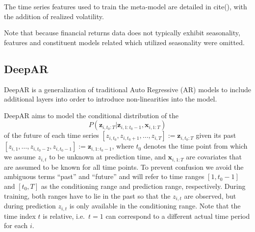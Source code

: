 \documentclass{article}
\newcommand{\z}[2]{z_{#1, #2}}
\newcommand{\zVec}[3]{\mathbf{z}_{#1, #2:#3}}
\newcommand{\xVec}[3]{\mathbf{x}_{#1, #2:#3}}
\begin{document}
The time series features used to train the meta-model are detailed in cite(), with the addition of realized volatility.

Note that because financial returns data does not typically exhibit seasonality, features and constituent models related which utilized seasonality were omitted.

\subsection{DeepAR}
DeepAR is a generalization of traditional Auto Regressive (AR) models to include additional layers into order to introduce non-linearities into the model.


DeepAR aims to model the conditional distribution of the 
\begin{equation*}
P(\zVec{i}{t_0}{T} | \zVec{i}{1}{t_0-1}, \xVec{i}{1}{T})
\label{eq:condDist}
\end{equation*}
of the future of each
time series $[\z{i}{t_0}, \z{i}{t_0 + 1}, \ldots, \z{i}{T}] := \zVec{i}{t_0}{T}$ given its 
\hbox{past $[\z{i}{1}, \ldots, \z{i}{t_0-2}, \z{i}{t_0-1}] := \zVec{i}{1}{t_0-1}$},
where $t_0$ denotes the time point from which we assume $\z{i}{t}$ to be unknown at prediction time,
and $\xVec{i}{1}{T}$ are covariates that are assumed to be known for all time points. To prevent
confusion we avoid the ambiguous terms ``past'' and ``future'' and will refer to time ranges $[1, t_0-1]$ and $[t_0, T]$ as the conditioning range and 
prediction range, respectively. During training, both ranges have to lie in the past so that the $\z{i}{t}$ are observed, but during prediction $\z{i}{t}$
is only available in the conditioning range. Note that the time index $t$ is relative, i.e.\ $t=1$ can correspond to a different actual
time period for each $i$. 

\newcommand{\modelDist}{Q_\Theta(\zVec{i}{t_0}{T} | \zVec{i}{1}{t_0-1}, \xVec{i}{1}{T})}
\end{document}
